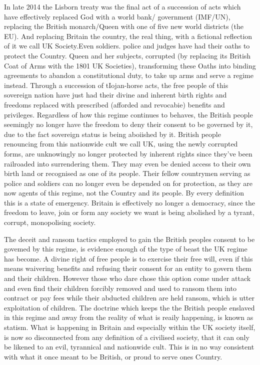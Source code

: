 \documentclass[letterpaper,10pt,openany,oneside,english]{sphinxmanual}
\begin{document}
In late 2014 the Lisborn treaty was the final act of a succession of acts which have effectively replaced God with a world bank/ government (IMF/UN), replacing the British monarch/Queen with one of five new world districts (the EU). And replacing Britain the country, the real thing, with a fictional reflection of it we call UK Society.Even soldiers. police and judges have had their oaths to protect the Country. Queen and her subjects, corrupted (by replacing its British Coat of Arms with the 1801 UK Societies), transforming these Oaths into binding agreements to abandon a constitutional duty, to take up arms and serve a regime instead. Through a succession of tIojan-horse acts, the free people of this sovereign nation have just had their divine and inherent birth rights and freedoms replaced with prescribed (afforded and revocabie) benefits and privileges. Regardless of how this regime continues to behaves, the British people seemingly no longer have the freedom to deny their consent to be governed by it, due to the fact sovereign status is being aboiished by it. British people renouncing from this nationwide cult we call UK, using the newly corrupted forms, are unknowingly no longer protected by inherent rights since they’ve been railroaded into surrendering them. They may even be denied access to their own birth land or recognised as one of its people. Their fellow countrymen serving as police and soldiers can no longer even be depended on for protection, as they are now agents of this regime, not the Country and its people. By every definition this is a state of emergency. Britain is effectively no longer a democracy, since the freedom to leave, join or form any society we want is being abolished by a tyrant, corrupt, monopolising society.

The deceit and ransom tactics employed to gain the British peoples consent to be govemed by this regime, is evidence enough of the type of beast the UK regime has become. A divine right of free people is to exercise their free will, even if this means waivering benefits and refusing their consent for an entity to govern them and their children. However those who dare chose this option come under attack and even find their children forcibly removed and used to ransom them into contract or pay fees while their abducted children are held ransom, which is utter exploitation of children. The doctrine which keeps the the British people enslaved in this regime and away from the reality of what is reaily happening, is known as statism. What is happening in Britain and especially within the UK society itself, is now so disconnected from any definition of a civilised society, that it can only be likened to an evil, tyrannical and nationwide cult. This is in no way consistent with what it once meant to be British, or proud to serve ones Country.
\end{document}
